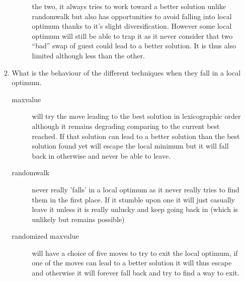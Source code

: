 \begin{enumerate}
\begin{enumerate}
\begin{framed}
\begin{description}
                        the two, it always tries to work toward a better solution
                        unlike randomwalk but also has opportunities to avoid
                        falling into local optimum thanks to it's slight
                        diversification. However some local optimum will still
                        be able to trap it as it never consider that two
                        \enquote{bad} swap of guest could lead to a better solution.
                        It is thus also limited although less than the other.
                    \end{description}
    			\end{framed}
    		\item What is the behaviour of the different techniques when they
            fall in a local optimum.
    			\begin{framed}
                    \begin{description}
    				\item[maxvalue] will try the move leading to the best
                    solution in lexicographic order although it remains
                    degrading comparing to the current best reached. If that
                    solution can lead to a better solution than the best
                    solution found yet will escape the local minimum but it
                    will fall back in otherwise and never be able to leave.
                    \newline
    				\item[randomwalk] never really 'falls' in a local optimum
                    as it never really tries to find them in the first place.
                    If it stumble upon one it will just casually leave it
                    unless it is really unlucky and keep going back in (which
                    is unlikely but remains possible)\newline
    				\item[randomized maxvalue] will have a choice of five
                    moves to try to exit the local optimum, if one of the moves
                    can lead to a better solution it will thus escape and
                    otherwise it will forever fall back and try to find a way
                    to exit.
                \end{description}
    			\end{framed}
    	\end{enumerate}
\end{enumerate}
